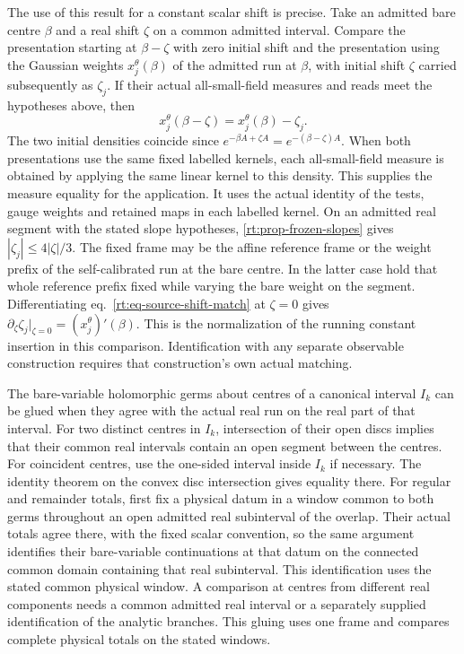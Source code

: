 \documentclass[11pt,letterpaper,reqno]{amsart}
\numberwithin{equation}{section}
\renewcommand{\eqref}[1]{\textup{eq.~\ref{#1}}}
\theoremstyle{definition}
\theoremstyle{remark}
\begin{document}
The use of this result for a constant scalar shift is precise. Take
an admitted bare centre $\beta$ and a real shift $\zeta$ on a common
admitted interval. Compare the presentation starting at
$\beta-\zeta$ with zero initial shift and the presentation using
the Gaussian weights $x_j^\theta(\beta)$ of the admitted run at
$\beta$, with initial shift $\zeta$ carried subsequently as
$\zeta_j$. If their actual all-small-field measures and reads meet
the hypotheses above, then
\begin{equation}\label{rt:eq-source-shift-match}
          x_j^\theta(\beta-\zeta)=x_j^\theta(\beta)-\zeta_j.
\end{equation}
The two initial densities coincide since
$e^{-\beta A+\zeta A}=e^{-(\beta-\zeta)A}$. When both presentations
use the same fixed labelled kernels, each all-small-field measure
is obtained by applying the same linear kernel to this density.
This supplies the measure equality for the application. It uses
the actual identity of the tests, gauge weights and retained maps
in each labelled kernel. On an admitted real segment with the
stated slope hypotheses, \cref{rt:prop-frozen-slopes} gives
$|\zeta_j|\le4|\zeta|/3$. The fixed frame may be the affine
reference frame or the weight prefix of the self-calibrated run
at the bare centre. In the latter case hold that whole reference
prefix fixed while varying the bare weight on the segment.
Differentiating \eqref{rt:eq-source-shift-match} at $\zeta=0$
gives $\partial_\zeta\zeta_j|_{\zeta=0}=(x_j^\theta)'(\beta)$.
This is the normalization of the running constant insertion in this
comparison. Identification with any separate observable construction
requires that construction's own actual matching.

The bare-variable holomorphic germs about centres of a canonical
interval $I_k$ can be glued when they agree with the actual real
run on the real part of that interval. For two distinct centres in
$I_k$, intersection of their open discs implies that their common
real intervals contain an open segment between the centres. For
coincident centres, use the one-sided interval inside $I_k$ if
necessary. The identity theorem on the convex disc intersection
gives equality there. For regular and remainder totals, first fix
a physical datum in a window common to both germs throughout an
open admitted real subinterval of the overlap. Their actual totals
agree there, with the fixed scalar convention, so the same argument
identifies their bare-variable continuations at that datum on the
connected common domain containing that real subinterval. This
identification uses the stated common physical window. A comparison
at centres from different real components
needs a common admitted real interval or a separately supplied
identification of the analytic branches. This gluing uses one frame
and compares complete physical totals on the stated windows.
\end{document}

